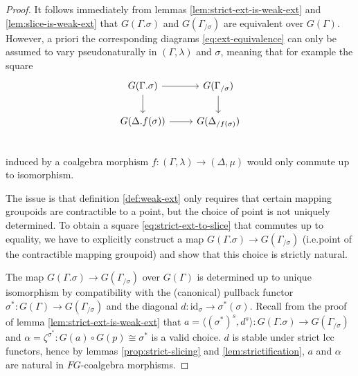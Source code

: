 \documentclass[a4paper]{article}
\theoremstyle{remark}
\theoremstyle{definition}
\begin{document}
\begin{proof}
  It follows immediately from lemmas \ref{lem:strict-ext-is-weak-ext} and \ref{lem:slice-is-weak-ext} that $G(\Gamma.\sigma)$ and $G(\Gamma_{/ \sigma})$ are equivalent over $G(\Gamma)$.
  However, a priori the corresponding diagrams \eqref{eq:ext-equivalence} can only be assumed to vary pseudonaturally in $(\Gamma, \lambda)$ and $\sigma$, meaning that for example the square
  \begin{equation}
    \label{eq:strict-ext-to-slice}
    \begin{tikzcd}
      G(\Gamma.\sigma) \arrow[r] \arrow[d] & G(\Gamma_{/ \sigma}) \arrow[d] \\
      G(\Delta.f(\sigma)) \arrow[r] & G(\Delta_{/ f(\sigma)}) \\
    \end{tikzcd}
  \end{equation}
  induced by a coalgebra morphism $f : (\Gamma, \lambda) \rightarrow (\Delta, \mu)$ would only commute up to isomorphism.

  The issue is that definition \ref{def:weak-ext} only requires that certain mapping groupoids are contractible to a point, but the choice of point is not uniquely determined.
  To obtain a square \eqref{eq:strict-ext-to-slice} that commutes up to equality, we have to explicitly construct a map $G(\Gamma.\sigma) \rightarrow G(\Gamma_{/ \sigma})$ (i.e.\@ point of the contractible mapping groupoid) and show that this choice is strictly natural.

  The map $G(\Gamma.\sigma) \rightarrow G(\Gamma_{/ \sigma})$ over $G(\Gamma)$ is determined up to unique isomorphism by compatibility with the (canonical) pullback functor $\sigma^* : G(\Gamma) \rightarrow G(\Gamma_{/ \sigma})$ and the diagonal $d : \mathrm{id}_\sigma \rightarrow \sigma^*(\sigma)$.
  Recall from the proof of lemma \ref{lem:strict-ext-is-weak-ext} that $a = \langle (\sigma^*)^s, d^s \rangle : G(\Gamma.\sigma) \rightarrow G(\Gamma_{/ \sigma})$ and $\alpha = \zeta^{\sigma^*} : G(a) \circ G(p) \cong \sigma^*$ is a valid choice.
  $d$ is stable under strict lcc functors, hence by lemmas \ref{prop:strict-slicing} and \ref{lem:strictification}, $a$ and $\alpha$ are natural in $FG$-coalgebra morphisms.


\end{proof}
\end{document}
